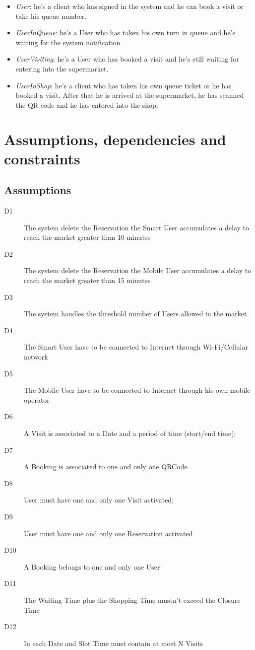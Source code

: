\begin{itemize}
\item \textit{User}: he’s a client who has signed in the system and he can book a visit or take his queue number.
\item \textit{UserInQueue}: he’s a User who has taken his own turn in queue and he’s waiting for the system notification
\item \textit{UserVisiting}: he’s a User who has booked a visit and he’s still waiting for entering into the supermarket.
\item \textit{UserInShop}: he’s a client who has taken his own queue ticket or he has booked a visit. After that he is arrived at the supermarket, he has scanned the QR code and he has entered into the shop.
\end{itemize}


\section{Assumptions, dependencies and constraints}
\subsection{Assumptions}
\begin{description}
    \item[D1] The system delete the Reservation the Smart User accumulates a delay to reach the market greater than 10 minutes
    \item[D2] The system delete the Reservation the Mobile User accumulates a delay to reach the market greater than 15 minutes
    \item[D3] The system handles the threshold number of Users allowed in the market
    \item[D4] The Smart User have to be connected to Internet through Wi-Fi/Cellular network
    \item[D5] The Mobile User have to be connected to Internet through his own mobile operator
    \item[D6] A Visit is associated to a Date and a period of time (start/end time);
    \item[D7] A Booking is associated to one and only one QRCode
    \item[D8] User must have one and only one Visit activated;
    \item[D9] User must have one and only one Reservation activated
    \item[D10] A Booking belongs to one and only one User
    \item[D11] The Waiting Time plus the Shopping Time mustn’t exceed the Closure Time
    \item[D12] In each Date and Slot Time must contain at most N Visits
\end{description}

